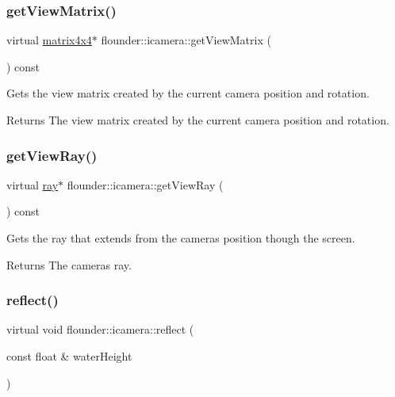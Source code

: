 \subsubsection{\texorpdfstring{get\+View\+Matrix()}{getViewMatrix()}}
{\footnotesize\ttfamily virtual \hyperlink{classflounder_1_1matrix4x4}{matrix4x4}$\ast$ flounder\+::icamera\+::get\+View\+Matrix (\begin{DoxyParamCaption}{ }\end{DoxyParamCaption}) const\hspace{0.3cm}{\ttfamily [pure virtual]}}



Gets the view matrix created by the current camera position and rotation. 

\begin{DoxyReturn}{Returns}
The view matrix created by the current camera position and rotation. 
\end{DoxyReturn}
\mbox{\label{classflounder_1_1icamera_ab2ff70f38f2e5a93223d3590b75a3b77}} 
\subsubsection{\texorpdfstring{get\+View\+Ray()}{getViewRay()}}
{\footnotesize\ttfamily virtual \hyperlink{classflounder_1_1ray}{ray}$\ast$ flounder\+::icamera\+::get\+View\+Ray (\begin{DoxyParamCaption}{ }\end{DoxyParamCaption}) const\hspace{0.3cm}{\ttfamily [pure virtual]}}



Gets the ray that extends from the cameras position though the screen. 

\begin{DoxyReturn}{Returns}
The cameras ray. 
\end{DoxyReturn}
\mbox{\label{classflounder_1_1icamera_a20ee0d37d318012ac51e132ed02af6da}} 
\subsubsection{\texorpdfstring{reflect()}{reflect()}}
{\footnotesize\ttfamily virtual void flounder\+::icamera\+::reflect (\begin{DoxyParamCaption}\item[{const float \&}]{water\+Height }\end{DoxyParamCaption})\hspace{0.3cm}{\ttfamily [pure virtual]}}



